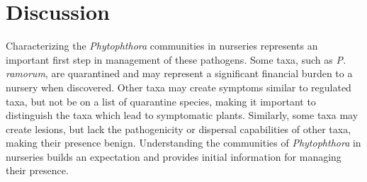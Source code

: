 \documentclass[12pt]{article}
\begin{document}



\section*{\sffamily\normalsize{Discussion}}


Characterizing the \emph{Phytophthora} communities in nurseries represents an important first step in management of these pathogens.  Some taxa, such as \emph{P. ramorum}, are quarantined and may represent a significant financial burden to a nursery when discovered.  Other taxa may create symptoms similar to regulated taxa, but not be on a list of quarantine species, making it important to distinguish the taxa which lead to symptomatic plants.  Similarly, some taxa may create lesions, but lack the pathogenicity or dispersal capabilities of other taxa, making their presence benign.  Understanding the communities of \emph{Phytophthora} in nurseries builds an expectation and provides initial information for managing their presence.
\end{document}
